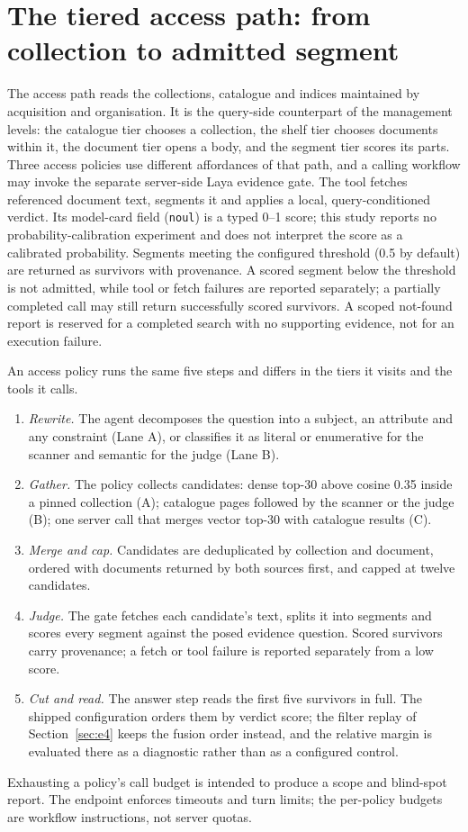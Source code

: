 \section{The tiered access path: from collection to admitted segment}
\label{sec:retrieval}
\label{sec:lanes}

The access path reads the collections, catalogue and indices maintained by
acquisition and organisation. It is the query-side counterpart of the
management levels: the catalogue tier chooses a collection, the shelf tier
chooses documents within it, the document tier opens a body, and the segment
tier scores its parts. Three access policies use different affordances of that
path, and a calling workflow may invoke the separate server-side Laya evidence
gate. The tool fetches referenced document text, segments it and applies a
local, query-conditioned verdict. Its model-card field (\texttt{noul}) is a
typed 0--1 score; this study reports no probability-calibration experiment and
does not interpret the score as a calibrated probability. Segments meeting the
configured threshold (0.5 by default) are returned as survivors with
provenance. A scored segment below the threshold is not admitted, while tool
or fetch failures are reported separately; a partially completed call may
still return successfully scored survivors. A scoped not-found report is
reserved for a completed search with no supporting evidence, not for an
execution failure.

An access policy runs the same five steps and differs in the tiers it visits
and the tools it calls.
\begin{enumerate}
\item \emph{Rewrite.} The agent decomposes the question into a subject, an
attribute and any constraint (Lane A), or classifies it as literal or
enumerative for the scanner and semantic for the judge (Lane B).
\item \emph{Gather.} The policy collects candidates: dense top-30 above cosine
0.35 inside a pinned collection (A); catalogue pages followed by the scanner
or the judge (B); one server call that merges vector top-30 with catalogue
results (C).
\item \emph{Merge and cap.} Candidates are deduplicated by collection and
document, ordered with documents returned by both sources first, and capped at
twelve candidates.
\item \emph{Judge.} The gate fetches each candidate's text, splits it into
segments and scores every segment against the posed evidence question. Scored
survivors carry provenance; a fetch or tool failure is reported separately from
a low score.
\item \emph{Cut and read.} The answer step reads the first five survivors in
full. The shipped configuration orders them by verdict score; the filter replay
of Section~\ref{sec:e4} keeps the fusion order instead, and the relative margin
is evaluated there as a diagnostic rather than as a configured control.
\end{enumerate}
Exhausting a policy's call budget is intended to produce a scope and blind-spot
report. The endpoint enforces timeouts and turn limits; the per-policy budgets
are workflow instructions, not server quotas.

